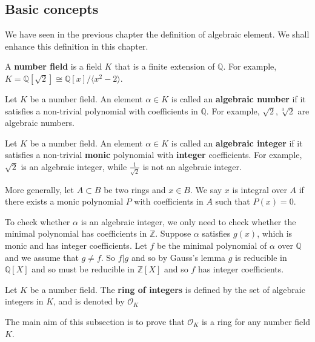 \subsection{Basic concepts}
We have seen in the previous chapter the definition of algebraic element. We shall enhance this definition in this chapter.
\begin{definition} A {\bf number field} is a field $K$ that is a finite extension of $\mathbb{Q}$.
For example, $K=\mathbb{Q}[\sqrt{2}] \cong \mathbb{Q}[x]/\langle x^2-2 \rangle$.
\end{definition}
\begin{definition} Let $K$ be a number field. An element $\alpha \in K$ is called an {\bf algebraic number} if it satisfies a non-trivial polynomial with coefficients in $\mathbb{Q}$. For example, $\sqrt{2},\sqrt[3]{2}$ are algebraic numbers.
\end{definition}
\begin{definition} Let $K$ be a number field. An element $\alpha \in K$ is called an {\bf algebraic
integer} if it satisfies a non-trivial {\bf monic} polynomial with {\bf integer} coefficients. For example, $\sqrt{2}$ is an algebraic integer, while $\frac{1}{\sqrt{2}}$ is not an algebraic integer.

More generally, let $A \subset B$ be two rings and $x \in B$. We say $x$ is integral over $A$ if there exists a monic polynomial $P$ with coefficients in $A$ such that $P(x)=0$.
\end{definition}
\begin{remark} To check whether $\alpha$ is an algebraic integer, we only need to check whether the minimal polynomial has coefficients in $\mathbb{Z}$. Suppose $\alpha$ satisfies $g(x)$, which is monic and has integer coefficients. Let $f$ be the minimal polynomial of $\alpha$ over $\mathbb{Q}$ and we assume that $g \neq f$. So $f|g$ and so by Gauss's lemma $g$ is reducible in $\mathbb{Q}[X]$ and so must be reducible in $\mathbb{Z}[X]$ and so $f$ has integer coefficients.
\end{remark}
\begin{definition} Let $K$ be a number field. The {\bf ring of integers} is defined by the set of algebraic integers in $K$, and is denoted by $\mathcal{O}_K$
\end{definition}
The main aim of this subsection is to prove that $\mathcal{O}_K$ is a ring for any number field $K$.
